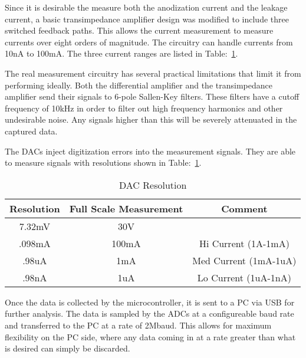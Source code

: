 Since it is desirable the measure both the anodization current and the leakage current, a basic transimpedance amplifier design was modified to include three switched feedback paths. This allows the current measurement to measure currents over eight orders of magnitude. The circuitry can handle currents from 10nA to 100mA. The three current ranges are listed in Table:~\ref{tab:dacRes}.

The real measurement circuitry has several practical limitations that limit it from performing ideally. Both the differential amplifier and the transimpedance amplifier send their signals to 6-pole Sallen-Key filters. These filters have a cutoff frequency of 10kHz\cite{sThesis} in order to filter out high frequency harmonics and other undesirable noise. Any signals higher than this will be severely attenuated in the captured data.

The DACs inject digitization errors into the measurement signals. They are able to measure signals with resolutions shown in Table:~\ref{tab:dacRes}.


\begin{table}[here]
\renewcommand{\arraystretch}{1.3}
\caption{DAC Resolution}
\label{tab:dacRes}
\centering
\begin{tabular}{c|c|c}
\hline
\bfseries Resolution & \bfseries Full Scale Measurement & \bfseries Comment\\
\hline\hline
7.32mV & 30V & \\
\hline
.098mA & 100mA & Hi Current (1A-1mA)\\
\hline
.98uA & 1mA & Med Current (1mA-1uA) \\
\hline
.98nA & 1uA & Lo Current (1uA-1nA)\\
\hline
\end{tabular}
\end{table}

Once the data is collected by the microcontroller, it is sent to a PC via USB for further analysis. The data is sampled by the ADCs at a configureable baud rate and transferred to the PC at a rate of 2Mbaud. This allows for maximum flexibility on the PC side, where any data coming in at a rate greater than what is desired can simply be discarded.

